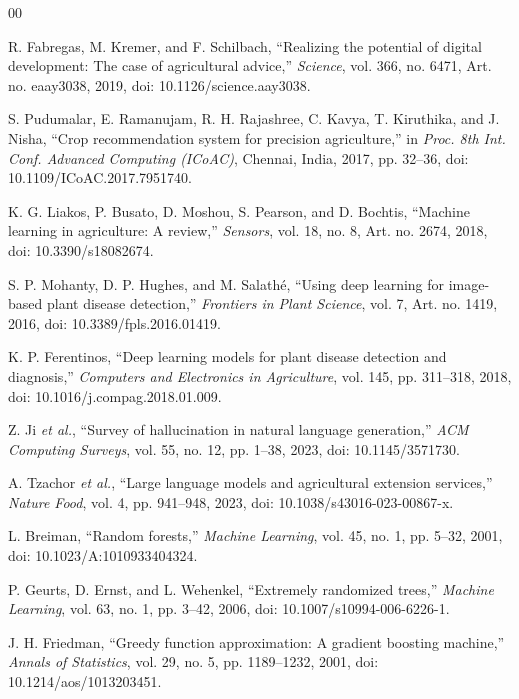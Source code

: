 \documentclass[conference]{IEEEtran}
\begin{document}
\begin{thebibliography}{00}

 R. Fabregas, M. Kremer, and F. Schilbach, ``Realizing the potential of digital development: The case of agricultural advice,'' \emph{Science}, vol. 366, no. 6471, Art. no. eaay3038, 2019, doi: 10.1126/science.aay3038.

 S. Pudumalar, E. Ramanujam, R. H. Rajashree, C. Kavya, T. Kiruthika, and J. Nisha, ``Crop recommendation system for precision agriculture,'' in \emph{Proc. 8th Int. Conf. Advanced Computing (ICoAC)}, Chennai, India, 2017, pp. 32--36, doi: 10.1109/ICoAC.2017.7951740.

 K. G. Liakos, P. Busato, D. Moshou, S. Pearson, and D. Bochtis, ``Machine learning in agriculture: A review,'' \emph{Sensors}, vol. 18, no. 8, Art. no. 2674, 2018, doi: 10.3390/s18082674.

 S. P. Mohanty, D. P. Hughes, and M. Salath\'e, ``Using deep learning for image-based plant disease detection,'' \emph{Frontiers in Plant Science}, vol. 7, Art. no. 1419, 2016, doi: 10.3389/fpls.2016.01419.

 K. P. Ferentinos, ``Deep learning models for plant disease detection and diagnosis,'' \emph{Computers and Electronics in Agriculture}, vol. 145, pp. 311--318, 2018, doi: 10.1016/j.compag.2018.01.009.

 Z. Ji \emph{et al.}, ``Survey of hallucination in natural language generation,'' \emph{ACM Computing Surveys}, vol. 55, no. 12, pp. 1--38, 2023, doi: 10.1145/3571730.

 A. Tzachor \emph{et al.}, ``Large language models and agricultural extension services,'' \emph{Nature Food}, vol. 4, pp. 941--948, 2023, doi: 10.1038/s43016-023-00867-x.

 L. Breiman, ``Random forests,'' \emph{Machine Learning}, vol. 45, no. 1, pp. 5--32, 2001, doi: 10.1023/A:1010933404324.

 P. Geurts, D. Ernst, and L. Wehenkel, ``Extremely randomized trees,'' \emph{Machine Learning}, vol. 63, no. 1, pp. 3--42, 2006, doi: 10.1007/s10994-006-6226-1.

 J. H. Friedman, ``Greedy function approximation: A gradient boosting machine,'' \emph{Annals of Statistics}, vol. 29, no. 5, pp. 1189--1232, 2001, doi: 10.1214/aos/1013203451.


\end{thebibliography}
\end{document}
